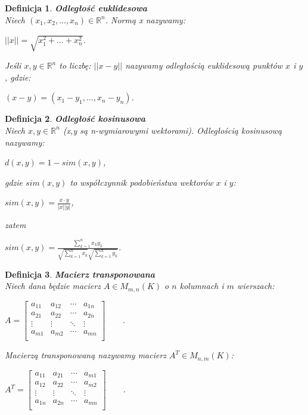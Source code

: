\documentclass[12pt,a4paper]{report}
\newtheorem{df}{Definicja}
\begin{document}
\begin{df}\textbf{Odległość euklidesowa} %
\\Niech $(x_1,x_2,...,x_n) \in \mathbb{R}^n $.
Normą x nazywamy:
\begin{center}
$||x|| = \sqrt{x_{1}^{2} + ... + x_{n}^{2}}$.
\end{center}
Jeśli $x,y \in \mathbb{R}^n $ to liczbę:
$||x-y||$ nazywamy odległością euklidesową punktów $x$ i $y$, gdzie:
\begin{center}
$(x-y) = (x_1-y_1,...,x_n-y_n)$.
\end{center}
\end{df}
\begin{df}\textbf{Odległość kosinusowa} %
\\Niech $x,y \in \mathbb{R}^n $ (x,y są n-wymiarowymi wektorami). Odległością kosinusową nazywamy:
\begin{center}
$d(x,y) = 1 - sim (x,y)$, 
\end{center}
gdzie $sim (x,y)$ to współczynnik podobieństwa wektorów $x$ i $y$:
\begin{center}
$sim (x,y) = \frac{x \cdot y}{|x||y|}$,
\end{center}
zatem
\begin{center}
$sim (x,y) = \frac{\sum_{k=1}^n x_k y_k}{\sqrt{\sum_{k=1}^n x_k}\sqrt{\sum_{k=1}^n y_k}}$.
\end{center}
\end{df}
\begin{df}\textbf{Macierz transponowana}%
\\Niech dana będzie macierz $A \in M_{m,n}(K)$ o $n$ kolumnach i $m$ wierszach:
\begin{center}
$ A= \left[
        \begin{array}{cccc}
         a_{11} & a_{12} & \cdots & a_{1n}\\
         a_{21} & a_{22} & \cdots & a_{2n}\\
         \vdots & \vdots & \ddots & \vdots\\
         a_{m1} & a_{m2} & \cdots & a_{mn}\\
         \end{array}
      \right]
      \qquad $.
\end{center}
Macierzą transponowaną nazywamy macierz $A^T \in M_{n,m}(K)$:
\begin{center}
$ A^T= \left[
        \begin{array}{cccc}
         a_{11} & a_{21} & \cdots & a_{m1}\\
         a_{12} & a_{22} & \cdots & a_{m2}\\
         \vdots & \vdots & \ddots & \vdots\\
         a_{1n} & a_{2n} & \cdots & a_{mn}\\
         \end{array}
      \right]
      \qquad $.
\end{center}
\end{df}
\end{document}
